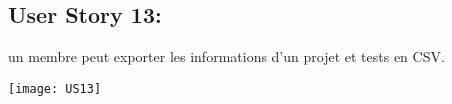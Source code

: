 \newpage{}
\subsection{User Story 13:}
un membre peut exporter les informations d'un projet et tests en CSV.

  \begin{center}
        \texttt{[image: US13]}
  \end{center}